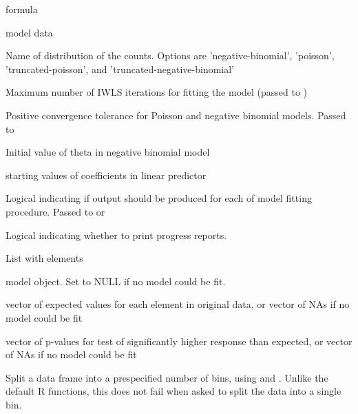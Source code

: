 \documentclass[letterpaper]{book}
\begin{document}
\begin{Arguments}
\begin{ldescription}
\item[\code{model.formula}] formula

\item[\code{data}] model data

\item[\code{distribution}] Name of distribution of the counts. Options are 'negative-binomial',
'poisson', 'truncated-poisson', and 'truncated-negative-binomial'

\item[\code{maxit}] Maximum number of IWLS iterations for fitting the model (passed to )

\item[\code{epsilon}] Positive convergence tolerance for Poisson and negative binomial models. Passed to 

\item[\code{init.theta}] Initial value of theta in negative binomial model

\item[\code{start}] starting values of coefficients in linear predictor

\item[\code{trace}] Logical indicating if output should be produced for each of model fitting procedure. Passed to  or 

\item[\code{verbose}] Logical indicating whether to print progress reports.
\end{ldescription}
\end{Arguments}
%
\begin{Value}
List with elements
\begin{ldescription}
\item[\code{model}] model object. Set to NULL if no model could be fit.
\item[\code{expected.values}] vector of expected values for each element in original data, or vector of NAs if no model could be fit
\item[\code{p.values}] vector of p-values for test of significantly higher response than expected, or vector of NAs if no model could be fit
\end{ldescription}
\end{Value}
%
\begin{Description}
Split a data frame into a prespecified number of bins, using
 and . Unlike the default R functions, this does not
fail when asked to split the data into a single bin.
\end{Description}
\end{document}
